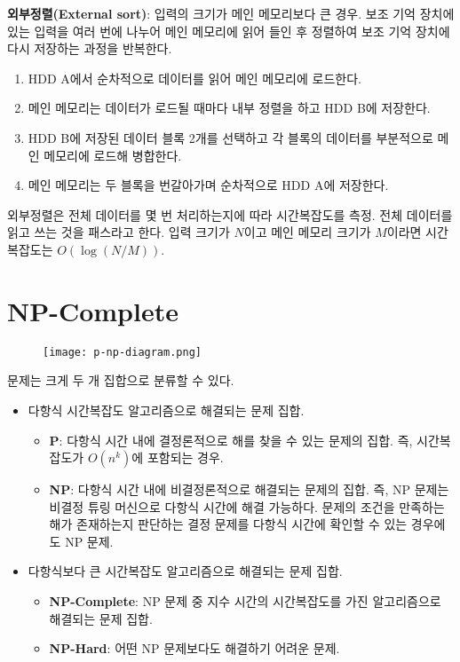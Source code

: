 \noindent \textbf{외부정렬(External sort)}: 입력의 크기가 메인 메모리보다 큰 경우. 보조 기억 장치에 있는 입력을 여러 번에 나누어 메인 메모리에 읽어 들인 후 정렬하여 보조 기억 장치에 다시 저장하는 과정을 반복한다.

\begin{enumerate}
  \item HDD A에서 순차적으로 데이터를 읽어 메인 메모리에 로드한다.
  \item 메인 메모리는 데이터가 로드될 때마다 내부 정렬을 하고 HDD B에 저장한다.
  \item HDD B에 저장된 데이터 블록 2개를 선택하고 각 블록의 데이터를 부분적으로 메인 메모리에 로드해 병합한다.
  \item 메인 메모리는 두 블록을 번갈아가며 순차적으로 HDD A에 저장한다.
\end{enumerate}

외부정렬은 전체 데이터를 몇 번 처리하는지에 따라 시간복잡도를 측정. 전체 데이터를 읽고 쓰는 것을 패스라고 한다. 입력 크기가 $N$이고 메인 메모리 크기가 $M$이라면 시간복잡도는 $O(\log(N / M))$.

\section{NP-Complete}

\begin{figure}[h]
  \centering
  \texttt{[image: p-np-diagram.png]}
\end{figure}

문제는 크게 두 개 집합으로 분류할 수 있다.

\begin{itemize}
  \item 다항식 시간복잡도 알고리즘으로 해결되는 문제 집합.
    \begin{itemize}
      \item \textbf{P}: 다항식 시간 내에 결정론적으로 해를 찾을 수 있는 문제의 집합. 즉, 시간복잡도가 $O(n^k)$에 포함되는 경우.
      \item \textbf{NP}: 다항식 시간 내에 비결정론적으로 해결되는 문제의 집합. 즉, NP 문제는 비결정 튜링 머신으로 다항식 시간에 해결 가능하다. 문제의 조건을 만족하는 해가 존재하는지 판단하는 결정 문제를 다항식 시간에 확인할 수 있는 경우에도 NP 문제.
    \end{itemize}
  \item 다항식보다 큰 시간복잡도 알고리즘으로 해결되는 문제 집합.
    \begin{itemize}
      \item \textbf{NP-Complete}: NP 문제 중 지수 시간의 시간복잡도를 가진 알고리즘으로 해결되는 문제 집합.
      \item \textbf{NP-Hard}: 어떤 NP 문제보다도 해결하기 어려운 문제.
    \end{itemize}
\end{itemize}

